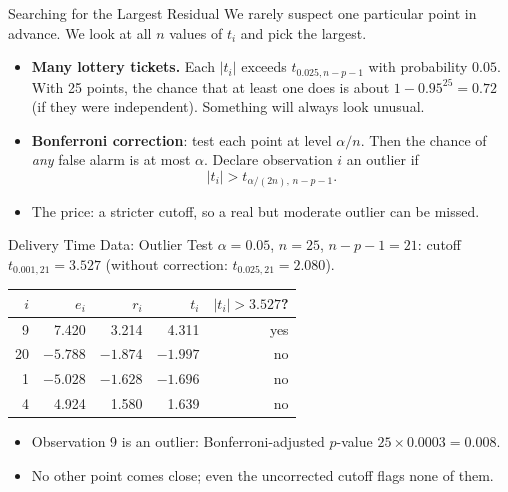 \begin{frame}{Searching for the Largest Residual}
    We rarely suspect one particular point in advance. We look at all $n$ values of $t_i$ and pick the largest.
    \svspace{0.3em}
    \begin{itemize}
        \item \textbf{Many lottery tickets.} Each $|t_i|$ exceeds $t_{0.025,n-p-1}$ with probability $0.05$. With 25 points, the chance that at least one does is about $1-0.95^{25}=0.72$ (if they were independent). Something will always look unusual.
        \item \textbf{Bonferroni correction}: test each point at level $\alpha/n$. Then the chance of \emph{any} false alarm is at most $\alpha$. Declare observation $i$ an outlier if
        \[
        |t_i|>t_{\alpha/(2n),\,n-p-1}.
        \]
        \item The price: a stricter cutoff, so a real but moderate outlier can be missed.
    \end{itemize}
\end{frame}


\begin{frame}{Delivery Time Data: Outlier Test}
    $\alpha=0.05$, $n=25$, $n-p-1=21$: cutoff $t_{0.001,21}=3.527$ (without correction: $t_{0.025,21}=2.080$).
    \begin{center}
        \small
        \begin{tabular}{rrrrr}
            \toprule
            $i$ & $e_i$ & $r_i$ & $t_i$ & $|t_i|>3.527$? \\
            \midrule
            9 & 7.420 & 3.214 & 4.311 & yes \\
            20 & $-5.788$ & $-1.874$ & $-1.997$ & no \\
            1 & $-5.028$ & $-1.628$ & $-1.696$ & no \\
            4 & 4.924 & 1.580 & 1.639 & no \\
            \bottomrule
        \end{tabular}
    \end{center}
    \begin{itemize}
        \item Observation 9 is an outlier: Bonferroni-adjusted $p$-value $25\times0.0003=0.008$.
        \item No other point comes close; even the uncorrected cutoff flags none of them.
    \end{itemize}
\end{frame}


